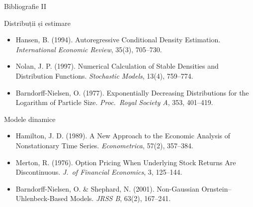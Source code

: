 \documentclass[9pt, aspectratio=169, t]{beamer}
\theoremstyle{definition}
\newenvironment{cminipage}[1]{%
    \par\noindent\hfill\begin{minipage}{#1}\ignorespaces
}{%
    \end{minipage}\hfill\null\par
}
\begin{document}
\begin{frame}{Bibliografie II}
    \vspace{-0.3cm}
    \begin{cminipage}{0.95\textwidth}
    \begin{block}{Distribuții și estimare}
        {\small
        \begin{itemize}\setlength{\itemsep}{0pt}
            \item Hansen, B. (1994). Autoregressive Conditional Density Estimation. \textit{International Economic Review}, 35(3), 705--730.
            \item Nolan, J. P. (1997). Numerical Calculation of Stable Densities and Distribution Functions. \textit{Stochastic Models}, 13(4), 759--774.
            \item Barndorff-Nielsen, O. (1977). Exponentially Decreasing Distributions for the Logarithm of Particle Size. \textit{Proc.\ Royal Society A}, 353, 401--419.
        \end{itemize}
        }
    \end{block}

    \begin{exampleblock}{Modele dinamice}
        {\small
        \begin{itemize}\setlength{\itemsep}{0pt}
            \item Hamilton, J. D. (1989). A New Approach to the Economic Analysis of Nonstationary Time Series. \textit{Econometrica}, 57(2), 357--384.
            \item Merton, R. (1976). Option Pricing When Underlying Stock Returns Are Discontinuous. \textit{J.\ of Financial Economics}, 3, 125--144.
            \item Barndorff-Nielsen, O. \& Shephard, N. (2001). Non-Gaussian Ornstein--Uhlenbeck-Based Models. \textit{JRSS B}, 63(2), 167--241.
        \end{itemize}
        }
    \end{exampleblock}
    \end{cminipage}
\end{frame}
\end{document}
